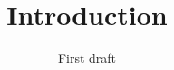 \documentclass[a4paper,english]{report}
\begin{document}
\title{Introduction}
\subtitle{First draft}


%



\end{document}
